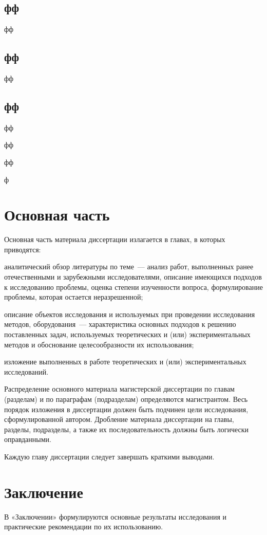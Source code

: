 \documentclass{mpaper}
\begin{document}
    \section{фф}

    фф

    \section{фф}

    фф

    \section{фф}

    фф

    фф

    фф

    ф

    \chapter{Основная часть}
    Основная часть материала диссертации излагается в главах, в которых приводятся:

    аналитический обзор литературы по теме~--– анализ работ, выполненных ранее отечественными и зарубежными исследователями, описание имеющихся подходов к исследованию проблемы, оценка степени изученности вопроса, формулирование проблемы, которая остается неразрешенной;

    описание объектов исследования и используемых при проведении исследования методов, оборудования~--- характеристика основных подходов к решению поставленных задач, используемых теоретических и (или) экспериментальных методов и обоснование целесообразности их использования;

    изложение выполненных в работе теоретических и (или) экспериментальных исследований.

    Распределение основного материала магистерской диссертации по главам (разделам) и по параграфам (подразделам) определяются магистрантом. Весь порядок изложения в диссертации должен быть подчинен цели исследования, сформулированной автором. Дробление материала диссертации на главы, разделы, подразделы, а также их
    последовательность должны быть логически оправданными.

    Каждую главу диссертации следует завершать краткими выводами.
    \chapter*{Заключение}
    В «Заключении» формулируются основные результаты исследования и практические рекомендации по их использованию.
\end{document}
